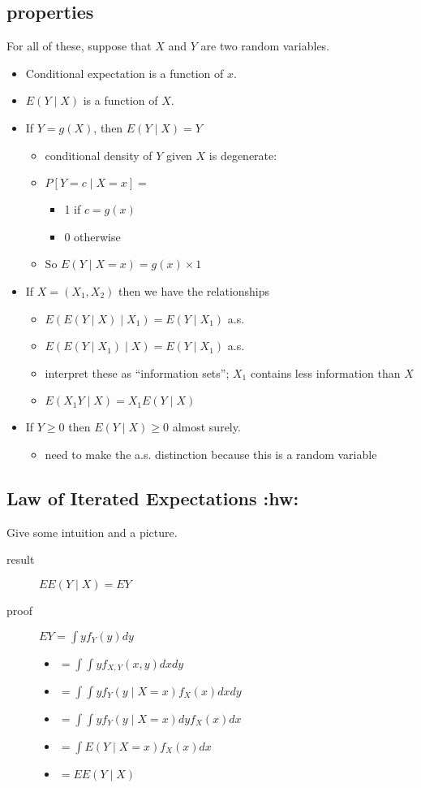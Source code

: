 \subsection{properties}
\label{sec-4-1}

     For all of these, suppose that $X$ and $Y$ are two random variables.
\begin{itemize}
\item Conditional expectation is a function of $x$.
\item $E(Y \mid X)$ is a function of $X$.
\item If $Y = g(X)$, then $E(Y \mid X) = Y$
\begin{itemize}
\item conditional density of $Y$ given $X$ is degenerate:
\item $P[Y = c \mid X = x] =$
\begin{itemize}
\item 1 if $c = g(x)$
\item 0 otherwise
\end{itemize}
\item So $E(Y \mid X = x) = g(x) \times 1$
\end{itemize}
\item If $X = (X_1, X_2)$ then we have the relationships
\begin{itemize}
\item $E(E(Y \mid X) \mid X_1) = E(Y \mid X_1)$ a.s.
\item $E(E(Y \mid X_1) \mid X) = E(Y \mid X_1)$ a.s.
\item interpret these as ``information sets''; $X_1$ contains
          less information than $X$
\item $E(X_1 Y \mid X) = X_1 E(Y \mid X)$
\end{itemize}
\item If $Y \geq 0$ then $E(Y \mid X) \geq 0$ almost surely.
\begin{itemize}
\item need to make the a.s. distinction because this is a random variable
\end{itemize}
\end{itemize}
\subsection{Law of Iterated Expectations \textbf{:hw:}}
\label{sec-4-2}

     Give some intuition and a picture.
\begin{description}
\item[result] $E E(Y \mid X) = E Y$
\item[proof] $E Y = \int y f_Y(y) dy$
\begin{itemize}
\item $= \int \int y f_{X,Y}(x,y) dx dy$
\item $= \int \int y f_Y(y \mid X = x) f_X(x) dx dy$
\item $= \int \int y f_Y(y \mid X = x) dy f_X(x) dx$
\item $= \int E(Y \mid X = x) f_X(x) dx$
\item $= E E(Y \mid X)$
\end{itemize}
\end{description}

